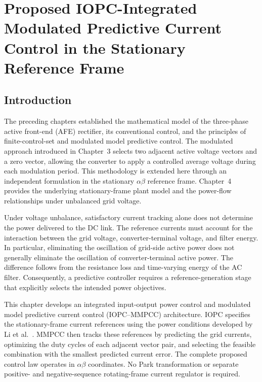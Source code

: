 \chapter{Proposed IOPC-Integrated Modulated Predictive Current Control in the Stationary Reference Frame}
\label{ch:proposed-iopc-mmpcc}

\section{Introduction}
The preceding chapters established the mathematical model of the three-phase active front-end (AFE) rectifier, its conventional control, and the principles of finite-control-set and modulated model predictive control. The modulated approach introduced in Chapter~3 selects two adjacent active voltage vectors and a zero vector, allowing the converter to apply a controlled average voltage during each modulation period. This methodology is extended here through an independent formulation in the stationary $\alpha\beta$ reference frame. Chapter~4 provides the underlying stationary-frame plant model and the power-flow relationships under unbalanced grid voltage.

Under voltage unbalance, satisfactory current tracking alone does not determine the power delivered to the DC link. The reference currents must account for the interaction between the grid voltage, converter-terminal voltage, and filter energy. In particular, eliminating the oscillation of grid-side active power does not generally eliminate the oscillation of converter-terminal active power. The difference follows from the resistance loss and time-varying energy of the AC filter. Consequently, a predictive controller requires a reference-generation stage that explicitly selects the intended power objectives.

This chapter develops an integrated input-output power control and modulated model predictive current control (IOPC--MMPCC) architecture. IOPC specifies the stationary-frame current references using the power conditions developed by Li et al.~\cite{li2010journal}. MMPCC then tracks these references by predicting the grid currents, optimizing the duty cycles of each adjacent vector pair, and selecting the feasible combination with the smallest predicted current error. The complete proposed control law operates in $\alpha\beta$ coordinates. No Park transformation or separate positive- and negative-sequence rotating-frame current regulator is required.

